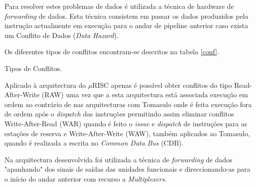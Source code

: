 Para resolver estes problemas de dados é utilizada a técnica de hardware de \textit{forwarding} de dados. Esta técnica consistem em passar os dados produzidos pela instrução actualmente em execução para o andar de pipeline anterior caso exista um Conflito de Dados (\textit{Data Hazard}).

Os diferentes tipos de conflitos encontram-se descritos na tabela \ref{conf}.

\begin{table}[H]
	\begin{center}
		\caption{Tipos de Conflitos.}
		\label{conf}
	\end{center}
\end{table}

Aplicado à arquitectura do $\mu$RISC apenas é possível obter conflitos do tipo Read-After-Write (RAW) uma vez que a esta arquitectura está associada execução em ordem ao contrário de nas arquitecturas com Tomasulo onde é feita execução fora de ordem após o \textit{dispatch} das instruções permitindo assim eliminar conflitos  Write-After-Read (WAR) quando é feito o \textit{issue} e \textit{dispatch} de instruções para as estações de reserva e Write-After-Write (WAW), também aplicados ao Tomasulo, quando é realizada a escrita no \textit{Common Data Bus} (CDB).

Na arquitectura desenvolvida foi utilizada a técnica de \textit{forwarding} de dados "apanhando" dos sinais de saídas das unidades funcionais e direccionando-as para o início do andar anterior com recurso a \textit{Multiplexers}.

